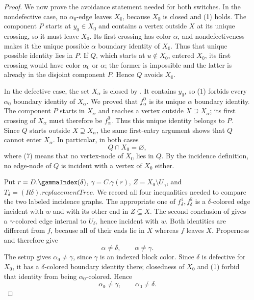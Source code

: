 \begin{proof}
We now prove the avoidance statement needed for both switches.  In the
nondefective case, no $\alpha_0$-edge leaves $X_0$, because $X_0$ is closed
and (1) holds.  The component $P$ starts at $y_0\in X_0$ and contains a
vertex outside $X$ at its unique crossing, so it must leave $X_0$.  Its
first crossing has color $\alpha$, and nondefectiveness makes it the unique
possible $\alpha$ boundary identity of $X_0$.  Thus that unique possible
identity lies in $P$.  If $Q$, which starts at $u\notin X_0$, entered
$X_0$, its first crossing would have color $\alpha_0$ or $\alpha$; the
former is impossible and the latter is already in the disjoint component
$P$.  Hence $Q$ avoids $X_0$.

In the defective case, the set $X_\alpha$ is closed by
.  It contains $y_0$, so (1)
forbids every $\alpha_0$ boundary identity of $X_\alpha$.  We proved that
$f^0_\alpha$ is its unique $\alpha$ boundary identity.  The component $P$
starts in $X_\alpha$ and reaches a vertex outside $X\supseteq X_\alpha$;
its first crossing of $X_\alpha$ must therefore be $f^0_\alpha$.  Thus
this unique identity belongs to $P$.  Since $Q$ starts outside
$X\supseteq X_\alpha$, the same first-entry argument shows that $Q$ cannot
enter $X_\alpha$.  In particular, in both cases
\[
 Q\cap X_0=\varnothing,                                    \tag{7}
\]
where (7) means that no vertex-node of $X_0$ lies in $Q$.  By the incidence
definition, no edge-node of $Q$ is incident with a vertex of $X_0$ either.

Put $r=D.\gammaIndex(\delta)$, $\gamma=C.\gamma(r)$,
$Z=X_0\setminus U_\gamma$, and
$T_\delta=(R\delta).replacementTree$.  We record all four inequalities
needed to compare the two labeled incidence graphs.  The appropriate one
of $f^1_\delta,f^2_\delta$ is a $\delta$-colored edge incident with $w$
and with its other end in $Z\subseteq X$.  The second conclusion of
 gives a $\gamma$-colored edge
internal to $U_\delta$, hence incident with $w$.  Both identities are
different from $f$, because all of their ends lie in $X$ whereas $f$
leaves $X$.  Properness and  therefore give
\[
 \alpha\ne\delta,\qquad \alpha\ne\gamma.                  \tag{8}
\]
The setup gives $\alpha_0\ne\gamma$, since $\gamma$ is an indexed block
color.  Since $\delta$ is defective for $X_0$, it has a
$\delta$-colored boundary identity there; closedness of $X_0$ and (1)
forbid that identity from being $\alpha_0$-colored.  Hence
\[
 \alpha_0\ne\gamma,\qquad \alpha_0\ne\delta.              \tag{9}
\]


\end{proof}

